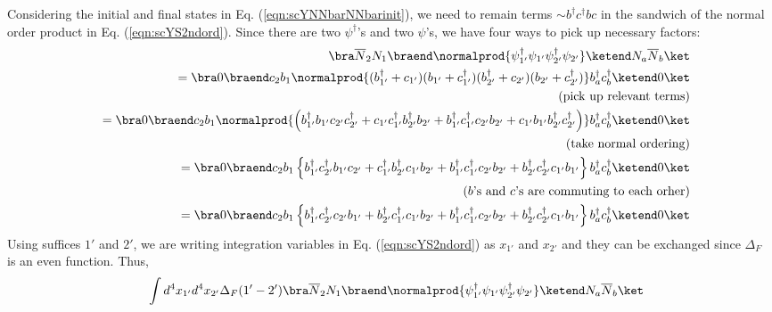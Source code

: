 {Considering the initial and final states in Eq. (\ref{eqn:scYNNbarNNbarinit}),
we need to remain terms $\sim b^\dagger c^\dagger bc$ in the sandwich of 
the normal order product in Eq. (\ref{eqn:scYS2ndord}). Since there are two
$\psi^\dagger$'s and two $\psi$'s, we have four ways to pick up necessary factors:
\begin{eqnarray}
&&
\bra \overline{N}_2 N_1 \braend 
\normalprod{\psi_{1'}^\dagger \psi_{1'} \psi_{2'}^\dagger \psi_{2'}}
\ketend N_a \overline{N}_b \ket
\nonumber\\
&&=
\bra 0 \braend c_2 b_1
\normalprod{
(b_{1'}^\dagger + c_{1'} ) ( b_{1'} + c_{1'}^\dagger) 
(b_{2'}^\dagger + c_{2'}) (b_{2'} + c_{2'}^\dagger)
}
b_a^\dagger c_b^\dagger 
\ketend 0 \ket
\nonumber\\
&& \mbox{(pick up relevant terms)}
\nonumber\\
&&=
\bra 0 \braend c_2 b_1
\normalprod{
\left(
b_{1'}^\dagger
b_{1'}
c_{2'} 
c_{2'}^\dagger
+
c_{1'}  
c_{1'}^\dagger
b_{2'}^\dagger
b_{2'}
+
b_{1'}^\dagger
c_{1'}^\dagger
c_{2'} 
b_{2'}
+
c_{1'}  
b_{1'}
b_{2'}^\dagger
c_{2'}^\dagger
\right)
}
b_a^\dagger c_b^\dagger 
\ketend 0 \ket
\nonumber\\
&& \mbox{(take normal ordering)}
\nonumber\\
&&=
\bra 0 \braend c_2 b_1
\left\{
b_{1'}^\dagger
c_{2'}^\dagger
b_{1'}
c_{2'} 
+
c_{1'}^\dagger
b_{2'}^\dagger
c_{1'}  
b_{2'}
+
b_{1'}^\dagger
c_{1'}^\dagger
c_{2'} 
b_{2'}
+
b_{2'}^\dagger
c_{2'}^\dagger
c_{1'}  
b_{1'}
\right\}
b_a^\dagger c_b^\dagger 
\ketend 0 \ket
\nonumber\\
&& \mbox{($b$'s and $c$'s are commuting to each orher)}
\nonumber\\
&&=
\bra 0 \braend c_2 b_1
\left\{
b_{1'}^\dagger
c_{2'}^\dagger
c_{2'} 
b_{1'}
+
b_{2'}^\dagger
c_{1'}^\dagger
c_{1'}  
b_{2'}
+
b_{1'}^\dagger
c_{1'}^\dagger
c_{2'} 
b_{2'}
+
b_{2'}^\dagger
c_{2'}^\dagger
c_{1'}  
b_{1'}
\right\}
b_a^\dagger c_b^\dagger 
\ketend 0 \ket
\nonumber\\
\label{eqn:NNbarSandwFirst}
\end{eqnarray}
Using suffices $1'$ and $2'$, 
we are writing integration variables in  Eq. (\ref{eqn:scYS2ndord})
as $x_{1'}$ and $x_{2'}$ and they can be exchanged 
since $\Delta_F$ is an even function. Thus,
\begin{eqnarray}
&&
\int d^4 x_{1'} d^4 x_{2'} \Delta_F(1' - 2')
\bra \overline{N}_2 N_1 \braend 
\normalprod{\psi_{1'}^\dagger \psi_{1'} \psi_{2'}^\dagger \psi_{2'}}
\ketend N_a \overline{N}_b \ket
\nonumber\\

\end{eqnarray}}
